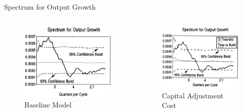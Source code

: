 \documentclass[10pt]{beamer}
\begin{document}
		      		\begin{frame}{Spectrum for Output Growth}
		      			\begin{columns}[T,onlytextwidth]
		      				\begin{figure}
		      					\centering
		      					\includegraphics[width=\linewidth]{figures/Base_spect.png}
		      					\caption{Baseline Model}
		      				\end{figure}
		      				
		      				\begin{figure}
		      					\centering
		      					\includegraphics[width=\linewidth]{figures/K_spect.png}
		      					\caption{Capital Adjustment Cost}
		      				\end{figure}
		      				

\end{columns}
\end{frame}
\end{document}
